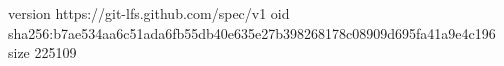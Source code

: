 version https://git-lfs.github.com/spec/v1
oid sha256:b7ae534aa6c51ada6fb55db40e635e27b398268178c08909d695fa41a9e4c196
size 225109
